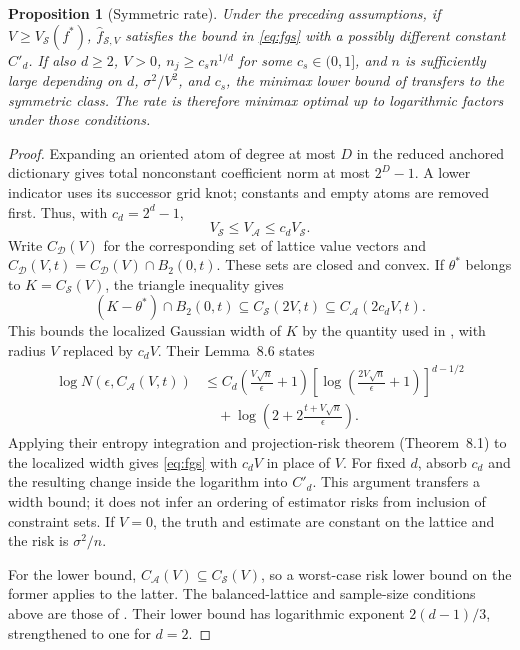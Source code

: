 \documentclass[11pt]{article}
\newtheorem{proposition}{Proposition}
\theoremstyle{definition}
\theoremstyle{remark}
\begin{document}
\begin{proposition}[Symmetric rate]\label{prop:rate}
Under the preceding assumptions, if $V\ge V_{\mathcal S}(f^*)$,
$\hat f_{\mathcal S,V}$ satisfies the bound in \eqref{eq:fgs} with a
possibly different constant $C'_d$. If also $d\ge2$, $V>0$,
$n_j\ge c_s n^{1/d}$ for some $c_s\in(0,1]$, and $n$ is sufficiently
large depending on $d$, $\sigma^2/V^2$, and $c_s$, the minimax lower bound
of \citet[Theorem~4.6]{fang2021} transfers to the symmetric class. The rate
is therefore minimax optimal up to logarithmic factors under those conditions.
\end{proposition}

\begin{proof}
Expanding an oriented atom of degree at most $D$ in the reduced anchored
dictionary gives total nonconstant coefficient norm at most $2^D-1$.
A lower indicator uses its successor grid knot; constants and empty atoms
are removed first. Thus, with $c_d=2^d-1$,
\[
 V_{\mathcal S}\le V_{\mathcal A}\le c_d V_{\mathcal S}.
\]
Write $C_{\mathcal D}(V)$ for the corresponding set of lattice value
vectors and $C_{\mathcal D}(V,t)=C_{\mathcal D}(V)\cap B_2(0,t)$.
These sets are closed and convex. If $\theta^*$ belongs to
$K=C_{\mathcal S}(V)$, the triangle inequality gives
\[
 (K-\theta^*)\cap B_2(0,t)
 \subseteq C_{\mathcal S}(2V,t)
 \subseteq C_{\mathcal A}(2c_dV,t).
\]
This bounds the localized Gaussian width of $K$ by the quantity used in
\citet[Section~8.4]{fang2021}, with radius $V$ replaced by $c_dV$.
Their Lemma~8.6 states
\begin{align*}
 \log N(\epsilon,C_{\mathcal A}(V,t))
 &\le C_d\left(\frac{V\sqrt n}{\epsilon}+1\right)
 \left[\log\left(\frac{2V\sqrt n}{\epsilon}+1\right)\right]^{d-1/2}\\
 &\quad+\log\left(2+2\frac{t+V\sqrt n}{\epsilon}\right).
\end{align*}
Applying their entropy integration and projection-risk theorem (Theorem~8.1)
to the localized width gives \eqref{eq:fgs} with $c_dV$ in place of $V$.
For fixed $d$, absorb $c_d$ and the resulting change inside the logarithm
into $C'_d$. This argument transfers a width bound; it does not infer an
ordering of estimator risks from inclusion of constraint sets. If $V=0$,
the truth and estimate are constant on the lattice and the risk is
$\sigma^2/n$.

For the lower bound, $C_{\mathcal A}(V)\subseteq C_{\mathcal S}(V)$,
so a worst-case risk lower bound on the former applies to the latter.
The balanced-lattice and sample-size conditions above are those of
\citet[Theorem~4.6]{fang2021}. Their lower bound has logarithmic exponent
$2(d-1)/3$, strengthened to one for $d=2$.
\end{proof}
\end{document}
